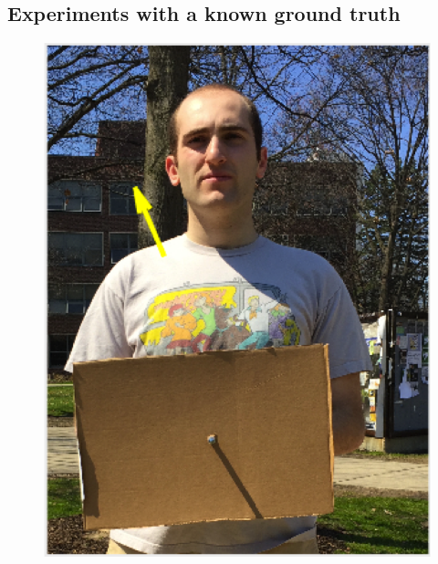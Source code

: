 \documentclass[10pt,twocolumn,letterpaper]{article}
\begin{document}
\subsection{Experiments with a known ground truth}
\begin{figure}[h]
\center
\includegraphics[scale = 0.3]{nathan.png}

\end{figure}
\end{document}
